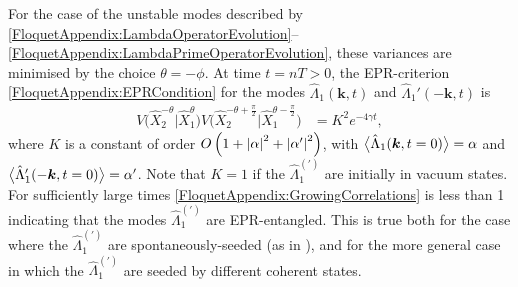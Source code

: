 For the case of the unstable modes described by \eqref{FloquetAppendix:LambdaOperatorEvolution}--\eqref{FloquetAppendix:LambdaPrimeOperatorEvolution}, these variances are minimised by the choice $\theta = -\phi$. At time $t = n T > 0$, the EPR-criterion \eqref{FloquetAppendix:EPRCondition} for the modes $\hat{\Lambda}_1(\bm{k}, t)$ and $\hat{\Lambda}_1'(-\bm{k}, t)$ is
\begin{align}
    V\big(\hat{X}_2^{-\theta} \big| \hat{X}_1^{\theta}\big)V\big(\hat{X}_2^{-\theta + \frac{\pi}{2}} \big| \hat{X}_1^{\theta - \frac{\pi}{2}}\big) &= K^2 e^{-4 \gamma t}, \label{FloquetAppendix:GrowingCorrelations}
\end{align}
where $K$ is a constant of order $O\left(1+\left|\alpha\right|^2  +\left|\alpha'\right|^2\right)$, with ${\big<\hat{\Lambda}_1(\bm{k}, t=0)\big>} = \alpha$ and ${\big<\hat{\Lambda}_1'(-\bm{k}, t=0)\big>} = \alpha'$. Note that $K=1$ if the $\hat{\Lambda}_1^{(\prime)}$ are initially in vacuum states. For sufficiently large times \eqref{FloquetAppendix:GrowingCorrelations} is less than 1 indicating that the modes $\hat{\Lambda}_1^{(\prime)}$ are EPR-entangled. This is true both for the case where the $\hat{\Lambda}_1^{(\prime)}$ are spontaneously-seeded (as in ), and for the more general case in which the $\hat{\Lambda}_1^{(\prime)}$ are seeded by different coherent states.

